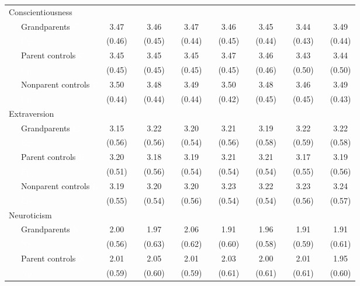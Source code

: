 \begin{appendix}
\begin{lltable}
{\begin{longtable}{lccccccccccccc}
Conscientiousness &  &  &  &  &  &  &  &  &  &  &  &  & \\
\ \ \ Grandparents \textcolor{white}{C} & 3.47 &  & 3.46 &  & 3.47 &  & 3.46 &  & 3.45 &  & 3.44 &  & 3.49\\
\ \ \ \textcolor{white}{Cg} & (0.46) &  & (0.45) &  & (0.44) &  & (0.45) &  & (0.44) &  & (0.43) &  & (0.44)\\
\ \ \ Parent controls \textcolor{white}{C} & 3.45 &  & 3.45 &  & 3.45 &  & 3.47 &  & 3.46 &  & 3.43 &  & 3.44\\
\ \ \ \textcolor{white}{Cp} & (0.45) &  & (0.45) &  & (0.45) &  & (0.45) &  & (0.46) &  & (0.50) &  & (0.50)\\
\ \ \ Nonparent controls \textcolor{white}{C} & 3.50 &  & 3.48 &  & 3.49 &  & 3.50 &  & 3.48 &  & 3.46 &  & 3.49\\
\ \ \ \textcolor{white}{Cn} & (0.44) &  & (0.44) &  & (0.44) &  & (0.42) &  & (0.45) &  & (0.45) &  & (0.43)\\
Extraversion &  &  &  &  &  &  &  &  &  &  &  &  & \\
\ \ \ Grandparents \textcolor{white}{E} & 3.15 &  & 3.22 &  & 3.20 &  & 3.21 &  & 3.19 &  & 3.22 &  & 3.22\\
\ \ \ \textcolor{white}{Eg} & (0.56) &  & (0.56) &  & (0.54) &  & (0.56) &  & (0.58) &  & (0.59) &  & (0.58)\\
\ \ \ Parent controls \textcolor{white}{E} & 3.20 &  & 3.18 &  & 3.19 &  & 3.21 &  & 3.21 &  & 3.17 &  & 3.19\\
\ \ \ \textcolor{white}{Ep} & (0.51) &  & (0.56) &  & (0.54) &  & (0.54) &  & (0.54) &  & (0.55) &  & (0.56)\\
\ \ \ Nonparent controls \textcolor{white}{E} & 3.19 &  & 3.20 &  & 3.20 &  & 3.23 &  & 3.22 &  & 3.23 &  & 3.24\\
\ \ \ \textcolor{white}{En} & (0.55) &  & (0.54) &  & (0.56) &  & (0.54) &  & (0.54) &  & (0.56) &  & (0.57)\\
Neuroticism &  &  &  &  &  &  &  &  &  &  &  &  & \\
\ \ \ Grandparents \textcolor{white}{N} & 2.00 &  & 1.97 &  & 2.06 &  & 1.91 &  & 1.96 &  & 1.91 &  & 1.91\\
\ \ \ \textcolor{white}{Ng} & (0.56) &  & (0.63) &  & (0.62) &  & (0.60) &  & (0.58) &  & (0.59) &  & (0.61)\\
\ \ \ Parent controls \textcolor{white}{N} & 2.01 &  & 2.05 &  & 2.01 &  & 2.03 &  & 2.00 &  & 2.01 &  & 1.95\\
\ \ \ \textcolor{white}{Np} & (0.59) &  & (0.60) &  & (0.59) &  & (0.61) &  & (0.61) &  & (0.61) &  & (0.60)\\

\end{longtable}}
\end{lltable}
\end{appendix}
